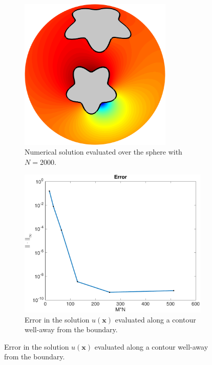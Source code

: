 \documentclass{sfuthesis}
\begin{document}
\begin{figure}[h]
    	\centering
     	\begin{subfigure}[b]{0.45\textwidth}
      		\includegraphics[width=0.8\textwidth]{Ex7-1TwoStarsSolnLapBelt}
		\caption{Numerical solution evaluated over the sphere with $N=2000$. }
		\label{fig: Ex7-1TwoStarsSolnLapBelt}
   	\end{subfigure} \hspace{1cm}
   	\begin{subfigure}[b]{0.45\textwidth}
     		\includegraphics[width=\textwidth]{Ex7-1TwoStarsError}
             	\caption{Error in the solution $u(\mathbf{x})$ evaluated along a contour well-away from the boundary. }

\end{subfigure}
\end{figure}
\end{document}
